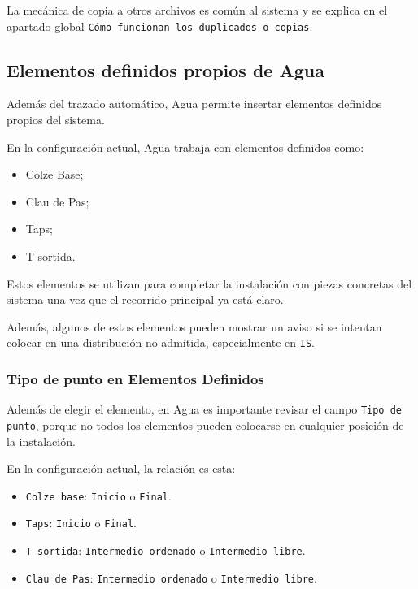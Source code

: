 La mecánica de copia a otros archivos es común al sistema y se explica en el apartado global \texttt{Cómo funcionan los duplicados o copias}.

\subsection{Elementos definidos propios de Agua}

Además del trazado automático, Agua permite insertar elementos definidos propios del sistema.

En la configuración actual, Agua trabaja con elementos definidos como:

\begin{itemize}
\item Colze Base;
\item Clau de Pas;
\item Taps;
\item T sortida.
\end{itemize}

Estos elementos se utilizan para completar la instalación con piezas concretas del sistema una vez que el recorrido principal ya está claro.

Además, algunos de estos elementos pueden mostrar un aviso si se intentan colocar en una distribución no admitida, especialmente en \texttt{IS}.


\subsubsection{Tipo de punto en Elementos Definidos}

Además de elegir el elemento, en Agua es importante revisar el campo \texttt{Tipo de punto}, porque no todos los elementos pueden colocarse en cualquier posición de la instalación.

En la configuración actual, la relación es esta:

\begin{itemize}
\item \texttt{Colze base}: \texttt{Inicio} o \texttt{Final}.
\item \texttt{Taps}: \texttt{Inicio} o \texttt{Final}.
\item \texttt{T sortida}: \texttt{Intermedio ordenado} o \texttt{Intermedio libre}.
\item \texttt{Clau de Pas}: \texttt{Intermedio ordenado} o \texttt{Intermedio libre}.
\end{itemize}

